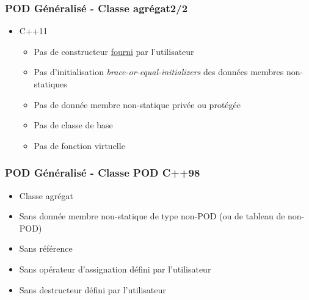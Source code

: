 \documentclass[C++.tex]{subfiles}
\begin{document}
\begin{frame}[fragile]
	\frametitle{POD Généralisé - Classe agrégat\titlehfill{}2/2}
	\begin{itemize}

		\item C++11
		\begin{itemize}
			\item Pas de constructeur \underline{fourni} par l'utilisateur


			\item Pas d'initialisation \textit{brace-or-equal-initializers} des données membres non-statiques
			\item Pas de donnée membre non-statique privée ou protégée
			\item Pas de classe de base
			\item Pas de fonction virtuelle
		\end{itemize}
	\end{itemize}


\end{frame}

\begin{frame}[fragile]
	\frametitle{POD Généralisé - Classe POD C++98}
	\begin{itemize}
		\item Classe agrégat
		\item Sans donnée membre non-statique de type non-POD (ou de tableau de non-POD)
		\item Sans référence
		\item Sans opérateur d'assignation défini par l'utilisateur
		\item Sans destructeur défini par l'utilisateur
	\end{itemize}
\end{frame}
\end{document}

